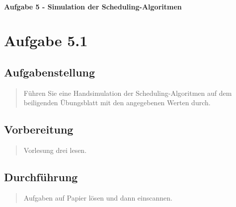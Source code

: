 \newpage

\paragraph{\LARGE Aufgabe 5 - Simulation der Scheduling-Algoritmen}

\section{Aufgabe 5.1}
	\subsection{Aufgabenstellung}
		\begin{quote}
			F\"uhren Sie eine Handsimulation der Scheduling-Algoritmen auf dem beiligenden \"Ubungsblatt mit den angegebenen Werten durch.\\
		\end{quote}
	\subsection{Vorbereitung}
		\begin{quote}
			Vorlesung drei lesen.\\
		\end{quote}
	\subsection{Durchführung}
		\begin{quote}
			Aufgaben auf Papier l\"osen und dann einscannen.\\
		\end{quote}
